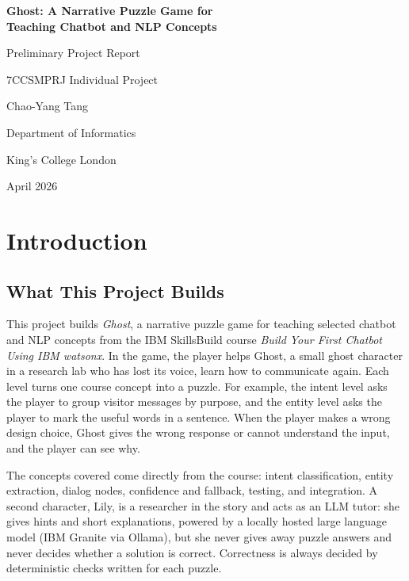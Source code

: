 \documentclass[11pt,a4paper]{article}
\begin{document}
\begin{titlepage}
\centering
\vspace*{3cm}
{\LARGE\bfseries Ghost: A Narrative Puzzle Game for\\[0.4em]
Teaching Chatbot and NLP Concepts\par}
\vspace{2cm}
{\large Preliminary Project Report\par}
\vspace{0.5cm}
{\large 7CCSMPRJ Individual Project\par}
\vspace{2cm}
{\large Chao-Yang Tang\par}
\vspace{0.5cm}
{\large Department of Informatics\par}
{\large King's College London\par}
\vspace{0.5cm}
{\large April 2026\par}
\vfill
\end{titlepage}

\section{Introduction}

\subsection{What This Project Builds}

This project builds \textit{Ghost}, a narrative puzzle game for teaching selected chatbot and NLP concepts from the IBM SkillsBuild course \textit{Build Your First Chatbot Using IBM watsonx}. In the game, the player helps Ghost, a small ghost character in a research lab who has lost its voice, learn how to communicate again. Each level turns one course concept into a puzzle. For example, the intent level asks the player to group visitor messages by purpose, and the entity level asks the player to mark the useful words in a sentence. When the player makes a wrong design choice, Ghost gives the wrong response or cannot understand the input, and the player can see why.

The concepts covered come directly from the course: intent classification, entity extraction, dialog nodes, confidence and fallback, testing, and integration. A second character, Lily, is a researcher in the story and acts as an LLM tutor: she gives hints and short explanations, powered by a locally hosted large language model (IBM Granite via Ollama), but she never gives away puzzle answers and never decides whether a solution is correct. Correctness is always decided by deterministic checks written for each puzzle.
\end{document}
